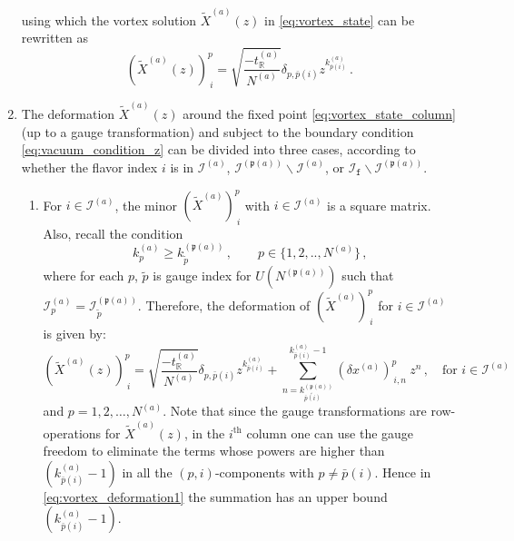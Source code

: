 \documentclass[12pt,a4paper]{article}
\renewcommand{\(}{\left(}
\renewcommand{\)}{\right)}
\renewcommand{\(}{\left(}
\renewcommand{\)}{\right)}
\begin{document}
\begin{enumerate}
\begin{equation}
\end{equation}
using which the vortex solution $\tilde{X}^{(a)}(z)$ in \eqref{eq:vortex_state} can be rewritten as 
\begin{equation}\label{eq:vortex_state_column}
(\tilde{X}^{(a)}(z))^p_{\ i}=\sqrt{\frac{-t^{(a)}_{\mathbb{R}}}{N^{(a)}}}\delta_{p,\bar{p}(i)}z^{k^{(a)}_{\bar{p}(i)}} \,.
\end{equation}
\item 
The deformation $\tilde{X}^{(a)}(z)$ around the fixed point \eqref{eq:vortex_state_column} (up to a gauge transformation) and subject to the boundary condition \eqref{eq:vacuum_condition_z} can be divided into three cases, according to whether the flavor index $i$ is in $ \mathcal{I}^{(a)}$, $ \mathcal{I}^{(\mathfrak{p}(a))}\backslash \mathcal{I}^{(a)}$, or $ \mathcal{I}_{\mathtt{f}}\backslash\mathcal{I}^{(\mathfrak{p}(a))}$.





\begin{enumerate}
\item For $i\in \mathcal{I}^{(a)}$, the minor $(\tilde{X}^{(a)})^p_{\ i}$ with $i\in \mathcal{I}^{(a)}$ is a square matrix.
Also, recall the condition 
\begin{equation}\label{eq:tree-codi_2}
k^{(a)}_{p}\geq k^{(\mathfrak{p}(a))}_{\tilde{p}}\,, \qquad p\in \{1,2,..,N^{(a)}\}\,,
\end{equation}
where for each $p$, $\tilde{p}$ is gauge index for $U(N^{(\mathfrak{p}(a))})$ such that $\mathcal{I}^{(a)}_{p}=\mathcal{I}^{(\mathfrak{p}(a))}_{\tilde{p}}$.
Therefore, the deformation of $(\tilde{X}^{(a)})^p_{\ i}$ for $i\in\mathcal{I}^{(a)}$ is given by:
\begin{equation}\label{eq:vortex_deformation1}
(\tilde{X}^{(a)}(z))^p_{\ i}=\sqrt{\frac{-t^{(a)}_{\mathbb{R}}}{N^{(a)}}}\delta_{p,\bar{p}(i)}z^{k^{(a)}_{\bar{p}(i)}}+\sum_{n=k^{(\mathfrak{p}(a))}_{\widetilde{\bar{p}(i)}}}^{k^{(a)}_{\bar{p}(i)}-1}(\delta x^{(a)})^p_{\ i,n}\ z^n\,,
\quad \text{for } 
i\in \mathcal{I}^{(a)}\,
\end{equation}
and $p=1,2,\dots,N^{(a)}$. 
Note that since the gauge transformations are row-operations for $\tilde{X}^{(a)}(z)$, in the $i^{\textrm{th}}$ column one can use the gauge freedom to eliminate the terms whose powers are higher than $(k^{(a)}_{\bar{p}(i)}-1)$ in all the $(p,i)$-components with $p\neq \bar{p}(i)$. 
Hence in \eqref{eq:vortex_deformation1} the summation has an upper bound $(k^{(a)}_{\bar{p}(i)}-1)$.



\end{enumerate}
\end{enumerate}
\end{document}
